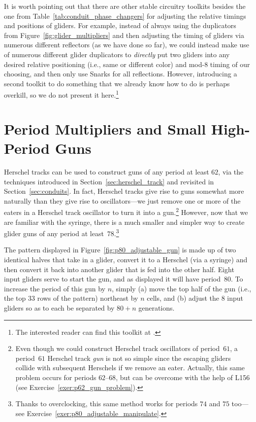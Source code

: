 It is worth pointing out that there are other stable circuitry toolkits besides the one from Table~\ref{tab:conduit_phase_changers} for adjusting the relative timings and positions of gliders. For example, instead of always using the duplicators from Figure~\ref{fig:glider_multipliers} and then adjusting the timing of gliders via numerous different reflectors (as we have done so far), we could instead make use of numerous different glider duplicators to \emph{directly} put two gliders into any desired relative positioning (i.e., same or different color) and mod-$8$ timing of our choosing, and then only use Snarks for all reflections. However, introducing a second toolkit to do something that we already know how to do is perhaps overkill, so we do not present it here.\footnote{The interested reader can find this toolkit at .}



\section{Period Multipliers and Small High-Period Guns}\label{sec:large_glider_guns}

Herschel tracks can be used to construct guns of any period at least $62$, via the techniques introduced in Section~\ref{sec:herschel_track} and revisited in Section~\ref{sec:conduits}. In fact, Herschel tracks give rise to guns somewhat more naturally than they give rise to oscillators---we just remove one or more of the eaters in a Herschel track oscillator to turn it into a gun.\footnote{Even though we could construct Herschel track oscillators of period~$61$, a period~$61$ Herschel track \emph{gun} is not so simple since the escaping gliders collide with subsequent Herschels if we remove an eater. Actually, this same problem occurs for periods $62$--$68$, but can be overcome with the help of L156 (see Exercise~\ref{exer:p62_gun_problem}).} However, now that we are familiar with the syringe, there is a much smaller and simpler way to create glider guns of any period at least~$78$.\footnote{Thanks to overclocking, this same method works for periods $74$ and $75$ too---see Exercise~\ref{exer:p80_adjustable_manipulate}.}

The pattern displayed in Figure~\ref{fig:p80_adjustable_gun} is made up of two identical halves that take in a glider, convert it to a Herschel (via a syringe) and then convert it back into another glider that is fed into the other half. Eight input gliders serve to start the gun, and as displayed it will have period~$80$. To increase the period of this gun by $n$, simply (a) move the top half of the gun (i.e., the top $33$ rows of the pattern) northeast by $n$ cells, and (b) adjust the $8$ input gliders so as to each be separated by $80+n$ generations.

